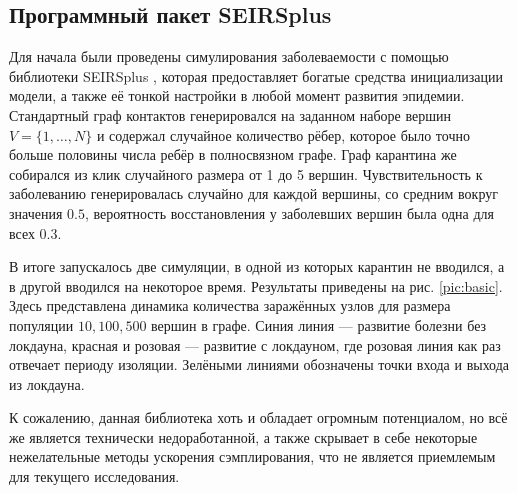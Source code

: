 	\subsection*{Программный пакет SEIRSplus}
	
	Для начала были проведены симулирования заболеваемости с помощью библиотеки SEIRSplus \cite{seirsplus}, которая предоставляет богатые средства инициализации модели, а также её тонкой настройки в любой момент развития эпидемии. Стандартный граф контактов генерировался на заданном наборе вершин $ V = \{1, \ldots, N\} $ и содержал случайное количество рёбер, которое было точно больше половины числа ребёр в полносвязном графе. Граф карантина же собирался из клик случайного размера от 1 до 5 вершин. Чувствительность к заболеванию генерировалась случайно для каждой вершины, со средним вокруг значения $ 0.5 $, вероятность восстановления у заболевших вершин была одна для всех $ 0.3 $. 
	
	В итоге запускалось две симуляции, в одной из которых карантин не вводился, а в другой вводился на некоторое время. Результаты приведены на рис. \ref{pic:basic}. Здесь представлена динамика количества заражённых узлов для размера популяции $ 10, 100, 500 $ вершин в графе. Синия линия --- развитие болезни без локдауна, красная и розовая --- развитие с локдауном, где розовая линия как раз отвечает периоду изоляции. Зелёными линиями обозначены точки входа и выхода из локдауна.
	
	К сожалению, данная библиотека хоть и обладает огромным потенциалом, но всё же является технически недоработанной, а также скрывает в себе некоторые нежелательные методы ускорения сэмплирования, что не является приемлемым для текущего исследования. 
	
